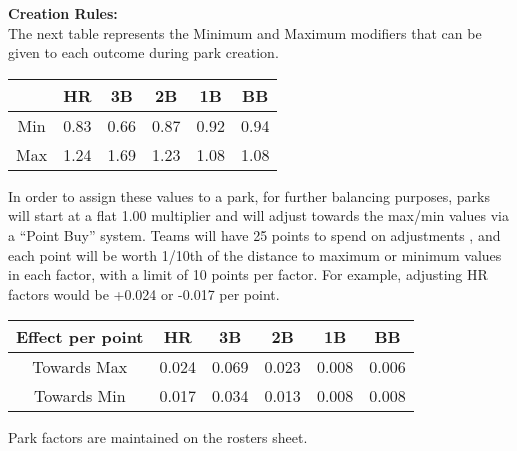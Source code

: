 \textbf{Creation Rules:}\\
The next table represents the Minimum and Maximum modifiers that can be given to each outcome during park creation.

\begin{center}
      \begin{tabular}{|c|c|c|c|c|c|}
	\hline
	& HR & 3B & 2B & 1B & BB \\
	\hline
	Min & 0.83 & 0.66 & 0.87 & 0.92 & 0.94 \\
	\hline
	Max & 1.24 & 1.69 & 1.23 & 1.08 & 1.08 \\
	\hline
     \end{tabular}
\end{center}

In order to assign these values to a park, for further balancing purposes, parks will start at a flat 1.00 multiplier and
 will adjust towards the max/min values via a “Point Buy” system. Teams will have 25 points to spend on adjustments
, and each point will be worth 1/10th of the distance to maximum or minimum values in each factor, with a limit of 10
 points per factor. For example, adjusting HR factors would be +0.024 or -0.017 per point.

\begin{center}
      \begin{tabular}{|c|c|c|c|c|c|}
	\hline
	Effect per point & HR & 3B & 2B & 1B & BB \\
	\hline
	Towards Max & 0.024 & 0.069 & 0.023 & 0.008 & 0.006 \\
	\hline
	Towards Min & 0.017 & 0.034 & 0.013 & 0.008 & 0.008 \\
	\hline
     \end{tabular}
\end{center}
Park factors are maintained on the rosters sheet.
